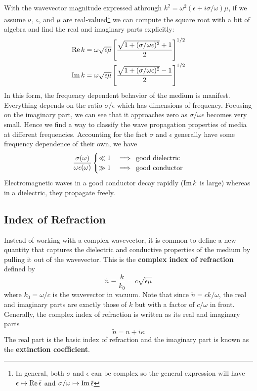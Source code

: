 \documentclass[twocolumn]{gwclass}
\begin{document}
	With the wavevector magnitude expressed athrough $k^2 = \omega^2(\epsilon + i \sigma/\omega)\mu$, if we assume $\sigma$, $\epsilon$, and $\mu$ are real-valued\footnote{In general, both $\sigma$ and $\epsilon$ can be complex so the general expression will have $\epsilon\mapsto \text{\normalfont{Re}}\,\tilde{\epsilon}$ and $\sigma/\omega\mapsto \text{\normalfont{Im}}\,\tilde{\epsilon}$} we can compute the square root with a bit of algebra and find the real and imaginary parts explicitly:
	\begin{align*}
		\text{\normalfont{Re}}\,k &= \omega \sqrt{\epsilon\mu}\left[ \frac{\sqrt{1 + (\sigma/\omega\epsilon)^2} + 1}{2}\right]^{1/2} \\
		\text{\normalfont{Im}}\,k &= \omega\sqrt{\epsilon\mu}\left[\frac{\sqrt{1 + (\sigma/\omega\epsilon)^2} - 1}{2}\right]^{1/2}
	\end{align*}
	In this form, the frequency dependent behavior of the medium is manifest. Everything depends on the ratio $\sigma/\epsilon$ which has dimensions of frequency. Focusing on the imaginary part, we can see that it approaches zero as $\sigma/\omega\epsilon$ becomes very small. Hence we find a way to classify the wave propagation properties of media at different frequencies. Accounting for the fact $\sigma$ and $\epsilon$ generally have some frequency dependence of their own, we have
	$$
		\frac{\sigma(\omega)}{\omega\epsilon(\omega)} \begin{cases}
			\ll 1 & \implies \:\text{\normalfont{good dielectric}} \\
			\gg 1 & \implies \:\text{\normalfont{good conductor}}
		\end{cases}
	$$
	Electromagnetic waves in a good conductor decay rapidly ($\text{\normalfont{Im}}\,k$ is large) whereas in a dielectric, they propagate freely. 
	
	\subsection{Index of Refraction}
	Instead of working with a complex wavevector, it is common to define a new quantity that captures the dielectric and conductive properties of the medium by pulling it out of the wavevector. This is the \textbf{complex index of refraction} defined by
	$$ \tilde{n} \equiv \frac{k}{k_0} = c\sqrt{\tilde{\epsilon}\mu} $$
	where $k_0=\omega/c$ is the wavevector in vacuum. Note that since $\tilde{n}=ck/\omega$, the real and imaginary parts are exactly those of $k$ but with a factor of $c/\omega$ in front. Generally, the complex index of refraction is written as its real and imaginary parts
	$$ \tilde{n} = n + i\kappa $$
	The real part is the basic index of refraction and the imaginary part is known as the \textbf{extinction coefficient}.
	
\end{document}
